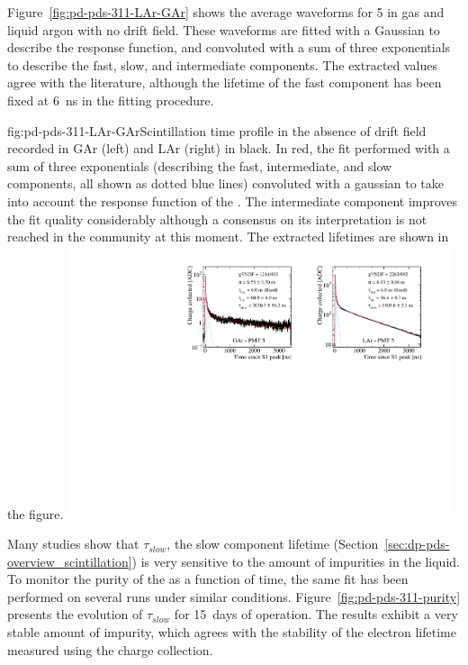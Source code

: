 Figure~\ref{fig:pd-pds-311-LAr-GAr} shows the average waveforms for  5 in gas and liquid argon with no drift field. These waveforms are fitted with a Gaussian to describe the response function, and convoluted with a sum of three exponentials to describe the fast, slow, and intermediate components. 
The extracted values agree with the literature, although the lifetime of the fast component has been fixed at \SI{6}{ns} in the fitting procedure.

\begin{dunefigure}{fig:pd-pds-311-LAr-GAr}{Scintillation time profile in the absence of drift field recorded in GAr (left) and LAr (right) in black. In red, the fit performed with a sum of three exponentials (describing the fast, intermediate, and slow components, all shown as dotted blue lines) convoluted with a gaussian to take into account the response function of the . The intermediate component improves the fit quality considerably although a consensus on its interpretation is not reached in the community at this moment. The extracted lifetimes are shown in the figure.}
\includegraphics[width=0.85\textwidth]{graphics/dppd_311_lar_gar_fit.pdf}
\end{dunefigure}

Many studies show that $\tau_{slow}$, the slow component lifetime (Section~\ref{sec:dp-pds-overview_scintillation}) is very sensitive to the amount of impurities in the liquid.
To monitor the purity of the  as a function of time, the same fit has been performed on several runs under similar conditions. 
Figure~\ref{fig:pd-pds-311-purity} presents the evolution of $\tau_{slow}$ for \SI{15}{days} of operation.
The results exhibit a very stable amount of impurity, which agrees with the stability of the electron lifetime measured using the charge collection.

